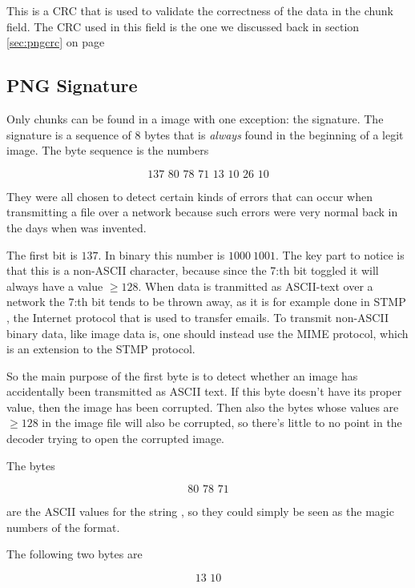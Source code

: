 This is a CRC that is used to validate the correctness of the data in
the chunk field. The CRC used in this field is the one we discussed
back in section \ref{sec:pngcrc} on page \pageref{sec:pngcrc}

\subsection{PNG Signature}

Only chunks can be found in a \png image with one exception: the \png
signature. The \png signature is a sequence of 8 bytes that is
\textit{always} found in the beginning of a legit \png image. The byte
sequence is the numbers

\begin{equation*}
  \text{137 80 78 71 13 10 26 10}
\end{equation*}

They were all chosen to detect certain kinds of errors that can occur
when transmitting a \png file over a network because such errors were
very normal back in the days when \png was invented.

The first bit is $137$. In binary this number is $1000\ 1001$. The key
part to notice is that this is a non-ASCII character, because since
the 7:th bit toggled it will always have a value $\ge 128$. When data
is tranmitted as ASCII-text over a network the 7:th bit tends to be
thrown away, as it is for example done in STMP \cite{rfc5321}, the
Internet protocol that is used to transfer emails. To transmit
non-ASCII binary data, like image data is, one should instead use the
MIME protocol, which is an extension to the STMP protocol.

So the main purpose of the first byte is to detect whether an image
has accidentally been transmitted as ASCII text. If this byte doesn't
have its proper value, then the image has been corrupted. Then also
the bytes whose values are $\ge 128$ in the image file will also be
corrupted, so there's little to no point in the decoder trying to open
the corrupted image.

The bytes

\begin{equation*}
  \text{80 78 71}
\end{equation*}

are the ASCII values for the string \png, so they could simply be seen
as the magic numbers of the \png format.

The following two bytes are

\begin{equation*}
  \text{13 10}
\end{equation*}

